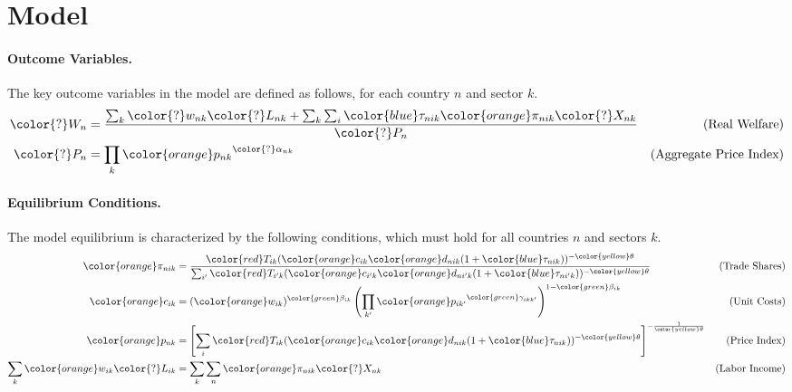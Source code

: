 \section{Model}
\paragraph{Outcome Variables.} The key outcome variables in the model are defined as follows, for each country $n$ and sector $k$.
\begin{align*}
    {\color{?}W_n} &= \frac{\sum_{k} {\color{?}w_{nk}} {\color{?}L_{nk}} + \sum_{k} \sum_{i} {\color{blue}\tau_{nik}} {\color{orange}\pi_{nik}} {\color{?}X_{nk}}}{{\color{?}P_n}} & \text{(Real Welfare)} \\
    {\color{?}P_n} &= \prod_{k} {\color{orange}p_{nk}}^{{\color{?}\alpha_{nk}}} & \text{(Aggregate Price Index)}
\end{align*}

\paragraph{Equilibrium Conditions.} The model equilibrium is characterized by the following conditions, which must hold for all countries $n$ and sectors $k$.
\begin{align*}
    {\color{orange}\pi_{nik}} &= \frac{{\color{red}T_{ik}} ({\color{orange}c_{ik}} {\color{orange}d_{nik}} (1 + {\color{blue}\tau_{nik}}))^{-{\color{yellow}\theta}}}{\sum_{i'} {\color{red}T_{i'k}} ({\color{orange}c_{i'k}} {\color{orange}d_{ni'k}} (1 + {\color{blue}\tau_{ni'k}}))^{-{\color{yellow}\theta}}} & \text{(Trade Shares)} \\
    {\color{orange}c_{ik}} &= ({\color{orange}w_{ik}})^{{\color{green}\beta_{ik}}} \left(\prod_{k'} {\color{orange}p_{ik'}}^{{\color{green}\gamma_{ikk'}}}\right)^{1 - {\color{green}\beta_{ik}}} & \text{(Unit Costs)} \\
    {\color{orange}p_{nk}} &= \left[ \sum_{i} {\color{red}T_{ik}} ({\color{orange}c_{ik}} {\color{orange}d_{nik}} (1 + {\color{blue}\tau_{nik}}))^{-{\color{yellow}\theta}} \right]^{-\frac{1}{{\color{yellow}\theta}}} & \text{(Price Index)} \\
   \sum_{k} {\color{orange}w_{ik}} {\color{?}L_{ik}} &= \sum_{k} \sum_{n} {\color{orange}\pi_{nik}} {\color{?}X_{nk}} & \text{(Labor Income)}
\end{align*}
